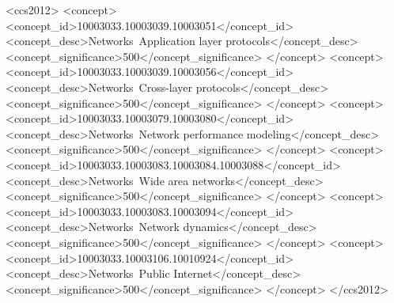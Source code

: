 \documentclass[sigplan, 10pt, screen]{acmart}
\begin{document}
\begin{CCSXML}
<ccs2012>
  <concept>
    <concept_id>10003033.10003039.10003051</concept_id>
    <concept_desc>Networks~Application layer protocols</concept_desc>
    <concept_significance>500</concept_significance>
  </concept>
  <concept>
    <concept_id>10003033.10003039.10003056</concept_id>
    <concept_desc>Networks~Cross-layer protocols</concept_desc>
    <concept_significance>500</concept_significance>
  </concept>
  <concept>
    <concept_id>10003033.10003079.10003080</concept_id>
    <concept_desc>Networks~Network performance modeling</concept_desc>
    <concept_significance>500</concept_significance>
  </concept>
  <concept>
    <concept_id>10003033.10003083.10003084.10003088</concept_id>
    <concept_desc>Networks~Wide area networks</concept_desc>
    <concept_significance>500</concept_significance>
  </concept>
  <concept>
    <concept_id>10003033.10003083.10003094</concept_id>
    <concept_desc>Networks~Network dynamics</concept_desc>
    <concept_significance>500</concept_significance>
  </concept>
  <concept>
    <concept_id>10003033.10003106.10010924</concept_id>
    <concept_desc>Networks~Public Internet</concept_desc>
    <concept_significance>500</concept_significance>
  </concept>
</ccs2012>
\end{CCSXML}



\maketitle










% 

\balance



\end{document}
